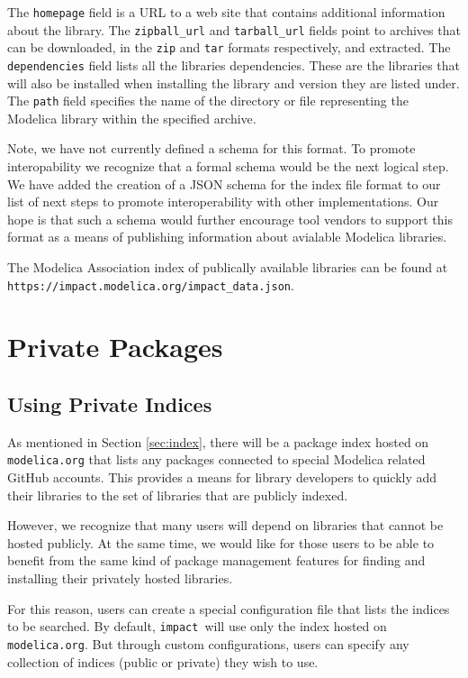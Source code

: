 \documentclass[11pt,a4paper,twocolumn]{article}
\newcommand{\impact}{\texttt{impact}} %
\newcommand{\code}[1]{\texttt{#1}} %
\begin{document}
The \code{homepage} field is a URL to a web site that contains additional
information about the library.  The \code{zipball\_url} and \code{tarball\_url}
fields point to archives that can be downloaded, in the \code{zip} and \code{tar} 
formats respectively, and extracted.  The \code{dependencies} field lists all the 
libraries dependencies.  These are the libraries that will also be installed
when installing the library and version they are listed under.  The \code{path}
field specifies the name of the directory or file representing the Modelica
library within the specified archive.

Note, we have not currently defined a schema for this format.  To promote
interopability we recognize that a formal schema would be the next logical
step.  We have added the creation of a JSON schema for the index file
format to our list of next steps to promote interoperability with other
implementations.  Our hope is that such a schema would further encourage
tool vendors to support this format as a means of publishing information
about avialable Modelica libraries.

The Modelica Association index of publically available libraries can be found
at \code{https://impact.modelica.org/impact\_data.json}.

\section{Private Packages}
\label{sec:private}

\subsection{Using Private Indices}
\label{sec:use_private}

As mentioned in Section \ref{sec:index}, there will be a package index hosted
on \code{modelica.org} that lists any packages connected to special Modelica
related GitHub accounts.  This provides a means for library developers to
quickly add their libraries to the set of libraries that are publicly indexed.

However, we recognize that many users will depend on libraries that cannot
be hosted publicly.  At the same time, we would like for those users to be
able to benefit from the same kind of package management features for
finding and installing their privately hosted libraries.

For this reason, users can create a special configuration file that
lists the indices to be searched.  By default, \impact\ will use only
the index hosted on \code{modelica.org}.  But through custom
configurations, users can specify any collection of indices (public
or private) they wish to use.
\end{document}
